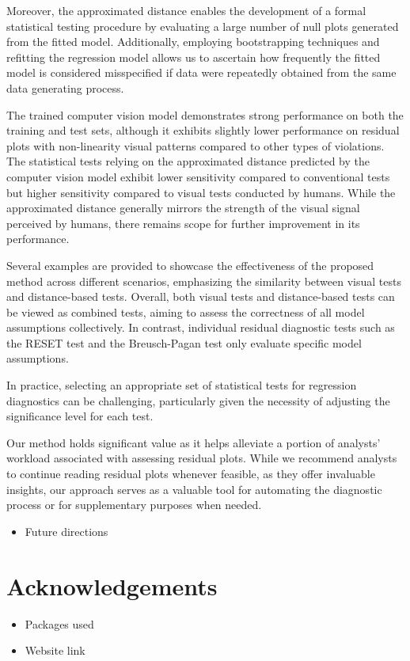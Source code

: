 \documentclass[]{interact}
\theoremstyle{plain}%
\theoremstyle{definition}
\theoremstyle{remark}
\providecommand{\tightlist}{%
  \setlength{\itemsep}{0pt}\setlength{\parskip}{0pt}}
\def\tightlist{}
\begin{document}
Moreover, the approximated distance enables the development of a formal
statistical testing procedure by evaluating a large number of null plots
generated from the fitted model. Additionally, employing bootstrapping
techniques and refitting the regression model allows us to ascertain how
frequently the fitted model is considered misspecified if data were
repeatedly obtained from the same data generating process.

The trained computer vision model demonstrates strong performance on
both the training and test sets, although it exhibits slightly lower
performance on residual plots with non-linearity visual patterns
compared to other types of violations. The statistical tests relying on
the approximated distance predicted by the computer vision model exhibit
lower sensitivity compared to conventional tests but higher sensitivity
compared to visual tests conducted by humans. While the approximated
distance generally mirrors the strength of the visual signal perceived
by humans, there remains scope for further improvement in its
performance.

Several examples are provided to showcase the effectiveness of the
proposed method across different scenarios, emphasizing the similarity
between visual tests and distance-based tests. Overall, both visual
tests and distance-based tests can be viewed as combined tests, aiming
to assess the correctness of all model assumptions collectively. In
contrast, individual residual diagnostic tests such as the RESET test
and the Breusch-Pagan test only evaluate specific model assumptions.

In practice, selecting an appropriate set of statistical tests for
regression diagnostics can be challenging, particularly given the
necessity of adjusting the significance level for each test.

Our method holds significant value as it helps alleviate a portion of
analysts' workload associated with assessing residual plots. While we
recommend analysts to continue reading residual plots whenever feasible,
as they offer invaluable insights, our approach serves as a valuable
tool for automating the diagnostic process or for supplementary purposes
when needed.

\begin{itemize}
\tightlist
\item
  Future directions
\end{itemize}

\section*{Acknowledgements}\label{acknowledgements}

\begin{itemize}
\tightlist
\item
  Packages used
\item
  Website link
\end{itemize}



\end{document}
